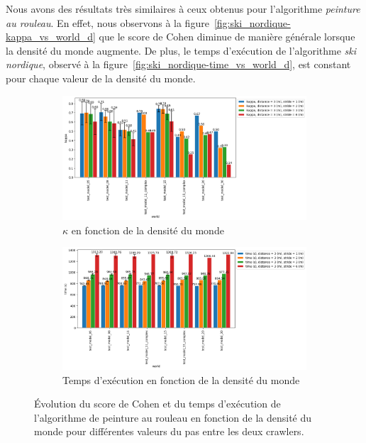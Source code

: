 \documentclass[francais,RandD]{rapportPFE}
\begin{document}
			Nous avons des résultats très similaires à ceux obtenus pour l'algorithme \textit{peinture au rouleau}.
			En effet, nous observons à la figure~\ref{fig:ski_nordique-kappa_vs_world_d} que le score de Cohen diminue de manière générale lorsque la densité du monde augmente.
			De plus, le temps d'exécution de l'algorithme \textit{ski nordique}, observé à la figure~\ref{fig:ski_nordique-time_vs_world_d}, est constant pour chaque valeur de la densité du monde.

			\begin{figure}[h!]
				\centering
				\begin{subfigure}[t]{0.9\linewidth}
					\includegraphics[width=\linewidth]{graphics/ski_nordique-kappa_vs_world_for_each_s.png}
					\caption{$\kappa$ en fonction de la densité du monde}
					\label{fig:ski_nordique-kappa_vs_world_s}
				\end{subfigure}
				\hfill
				\begin{subfigure}[t]{0.9\linewidth}
						\includegraphics[width=\linewidth]{graphics/ski_nordique-time_vs_world_for_each_s.png}
						\caption{Temps d'exécution en fonction de la densité du monde}
						\label{fig:ski_nordique-time_vs_world_s}
				\end{subfigure}
				\caption{Évolution du score de Cohen et du temps d'exécution de l'algorithme de peinture au rouleau en fonction de la densité du monde pour différentes valeurs du pas entre les deux crawlers.}
				\label{fig:ski_nordique-world_s}
			\end{figure}
\end{document}
